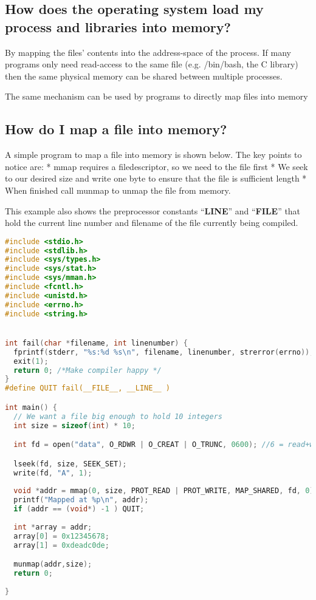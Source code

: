 \subsection{How does the operating system load my process and libraries into memory?}\label{how-does-the-operating-system-load-my-process-and-libraries-into-memory}

By mapping the files' contents into the address-space of the process. If many programs only need read-access to the same file (e.g. /bin/bash, the C library) then the same physical memory can be shared between multiple processes.

The same mechanism can be used by programs to directly map files into memory

\subsection{How do I map a file into memory?}\label{how-do-i-map-a-file-into-memory}

A simple program to map a file into memory is shown below. The key points to notice are: * mmap requires a filedescriptor, so we need to  the file first * We seek to our desired size and write one byte to ensure that the file is sufficient length * When finished call munmap to unmap the file from memory.

This example also shows the preprocessor constants ``\textbf{LINE}'' and ``\textbf{FILE}'' that hold the current line number and filename of the file currently being compiled.

\begin{lstlisting}[language=C]
#include <stdio.h>
#include <stdlib.h>
#include <sys/types.h>
#include <sys/stat.h>
#include <sys/mman.h>
#include <fcntl.h>
#include <unistd.h>
#include <errno.h>
#include <string.h>


int fail(char *filename, int linenumber) { 
  fprintf(stderr, "%s:%d %s\n", filename, linenumber, strerror(errno)); 
  exit(1);
  return 0; /*Make compiler happy */
}
#define QUIT fail(__FILE__, __LINE__ )

int main() {
  // We want a file big enough to hold 10 integers  
  int size = sizeof(int) * 10;

  int fd = open("data", O_RDWR | O_CREAT | O_TRUNC, 0600); //6 = read+write for me!

  lseek(fd, size, SEEK_SET);
  write(fd, "A", 1);
  
  void *addr = mmap(0, size, PROT_READ | PROT_WRITE, MAP_SHARED, fd, 0);
  printf("Mapped at %p\n", addr);
  if (addr == (void*) -1 ) QUIT;
  
  int *array = addr;
  array[0] = 0x12345678;
  array[1] = 0xdeadc0de;

  munmap(addr,size);
  return 0;
  
}
\end{lstlisting}


